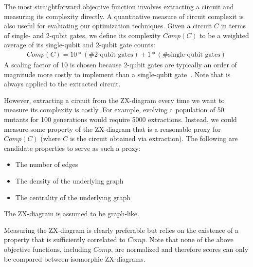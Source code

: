 The most straightforward objective function involves extracting a circuit and measuring its complexity directly.
A quantitative measure of circuit complexit is also useful for evaluating our optimization techniques.
Given a circuit $C$ in terms of single- and 2-qubit gates, we define its complexity $Comp(C)$ to be a weighted average of its single-qubit and 2-qubit gate counts:
\begin{align*}
  Comp(C) = 10 * (\text{\# 2-qubit gates}) + 1 * (\text{\# single-qubit gates})
\end{align*}
A scaling factor of 10 is chosen because 2-qubit gates are typically an order of magnitude more costly to implement than a single-qubit gate~\cite{campbell2017roads, ballance2016high}.
Note that  is always applied to the extracted circuit.


However, extracting a circuit from the ZX-diagram every time we want to measure its complexity is costly.
For example, evolving a population of 50 mutants for 100 generations would require 5000 extractions.
Instead, we could measure some property of the ZX-diagram that is a reasonable proxy for $Comp(C)$ (where $C$ is the circuit obtained via extraction).
The following are candidate properties to serve as such a proxy:
\begin{itemize}
\item
  The number of edges
\item
  The density of the underlying graph~\cite{xu2010web}
\item
  The centrality of the underlying graph~\cite{scott2011sage}
\end{itemize}
The ZX-diagram is assumed to be graph-like.

Measuring the ZX-diagram is clearly preferable but relies on the existence of a property that is sufficiently correlated to $Comp$.
Note that none of the above objective functions, including $Comp$, are normalized and therefore scores can only be compared between isomorphic ZX-diagrams.

